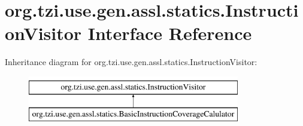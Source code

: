 \hypertarget{interfaceorg_1_1tzi_1_1use_1_1gen_1_1assl_1_1statics_1_1_instruction_visitor}{\section{org.\-tzi.\-use.\-gen.\-assl.\-statics.\-Instruction\-Visitor Interface Reference}
\label{interfaceorg_1_1tzi_1_1use_1_1gen_1_1assl_1_1statics_1_1_instruction_visitor}
}
Inheritance diagram for org.\-tzi.\-use.\-gen.\-assl.\-statics.\-Instruction\-Visitor\-:\begin{figure}[H]
\begin{center}
\leavevmode
\includegraphics[height=2.000000cm]{interfaceorg_1_1tzi_1_1use_1_1gen_1_1assl_1_1statics_1_1_instruction_visitor}
\end{center}
\end{figure}
